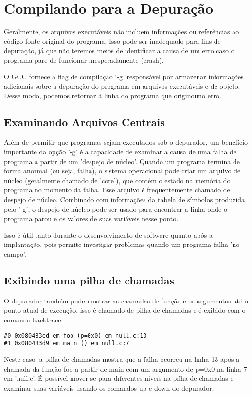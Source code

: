 \chapter{Compilando para a Depuração}

Geralmente, os arquivos executáveis não incluem informações ou referências ao código-fonte original do programa. Isso pode ser inadequado para fins de depuração, já que não teremos meios de identificar a causa de um erro caso o programa pare de funcionar inesperadamente (crash).

O GCC fornece a flag de compilação `-g' responsável por armazenar informações adicionais sobre a depuração do programa em arquivos executáveis e de objeto. Desse modo, podemos retornar à linha do programa que originouno erro.

\section{Examinando Arquivos Centrais}

Além de permitir que programas sejam executados sob o depurador, um benefício importante da opção '-g' é a capacidade de examinar a causa de uma falha de programa a partir de um 'despejo de núcleo'. Quando um programa termina de forma anormal (ou seja, falha), o sistema operacional pode criar um arquivo de núcleo (geralmente chamado de 'core'), que contém o estado na memória do programa no momento da falha. Esse arquivo é frequentemente chamado de despejo de núcleo. Combinado com informações da tabela de símbolos produzida pelo '-g', o despejo de núcleo pode ser usado para encontrar a linha onde o programa parou e os valores de suas variáveis nesse ponto.

Isso é útil tanto durante o desenvolvimento de software quanto após a implantação, pois permite investigar problemas quando um programa falha 'no campo'.

\section{Exibindo uma pilha de chamadas}

O depurador também pode mostrar as chamadas de função e os argumentos até o ponto atual de execução, isso é chamado de pilha de chamadas e é exibido com o comando backtrace:

\begin{scriptsize}
\estiloC
\begin{lstlisting}[title=(gdb) backtrace]
#0 0x080483ed em foo (p=0x0) em null.c:13
#1 0x080483d9 em main () em null.c:7
\end{lstlisting}
\end{scriptsize}


Neste caso, a pilha de chamadas mostra que a falha ocorreu na linha 13 após a chamada da função foo a partir de main com um argumento de p=0x0 na linha 7 em 'null.c'. É possível mover-se para diferentes níveis na pilha de chamadas e examinar suas variáveis usando os comandos up e down do depurador.